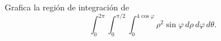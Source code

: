 Grafica la región de integración de
\[
\int_0^{2\pi}\int_0^{\pi/2}\int_0^{4\cos\varphi}
\rho^2\sin\varphi\,d\rho\,d\varphi\,d\theta.
\]
